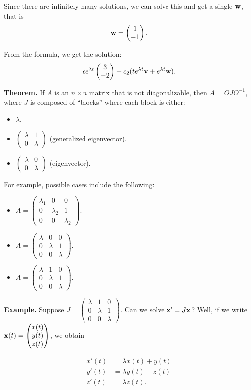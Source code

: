 \documentclass{article}
\newcommand{\mat}[1]{\begin{pmatrix}#1\end{pmatrix}}
\begin{document}
Since there are infinitely many solutions, we can solve this and get a single $\mathbf{w}$, that is
\begin{align*}
  \mbf{w} = \mat{1 \\ -1}.
\end{align*}

From the formula, we get the solution:
\begin{align*}
  c e^{\lambda t} \mat{3 \\ -2} + c_2 ( t e^{\lambda t} \mbf{v} + e^{\lambda t} \mbf{w}).
\end{align*} 

{\bf Theorem.} If $A$ is an $n \times n$ matrix that is not diagonalizable, then $A = O J O^{-1}$, where $J$ is composed of ``blocks'' where each block is either:
\begin{itemize}
  \item $\lambda$,
  \item $\mat{\lambda & 1 \\ 0 & \lambda}$ (generalized eigenvector).
  \item $\mat{\lambda & 0 \\ 0 & \lambda}$ (eigenvector).
\end{itemize}

For example, possible cases include the following:

\begin{itemize}
  \item $A = \mat{\lambda_1 & 0 & 0 \\ 0 & \lambda_2 & 1 \\ 0 & 0 & \lambda_2}$.
  \item $A = \mat{\lambda & 0 & 0 \\ 0 & \lambda & 1 \\ 0 & 0 & \lambda}$.
  \item $A = \mat{\lambda & 1 & 0 \\ 0 & \lambda & 1 \\ 0 & 0 & \lambda}$.
\end{itemize}

{\bf Example.} Suppose $J = \mat{\lambda & 1 & 0 \\ 0 & \lambda & 1 \\ 0 & 0 & \lambda}$.  Can we solve $\mathbf{x}' = J \mathbf{x}$?  Well, if we write $\mbf{x}(t) = \mat{x(t) \\ y(t) \\ z(t)}$, we obtain

\begin{align*}
  x'(t) &= \lambda x(t) + y(t) \\
  y'(t) &= \lambda y(t) + z(t) \\
  z'(t) &= \lambda z(t).
\end{align*}
\end{document}
